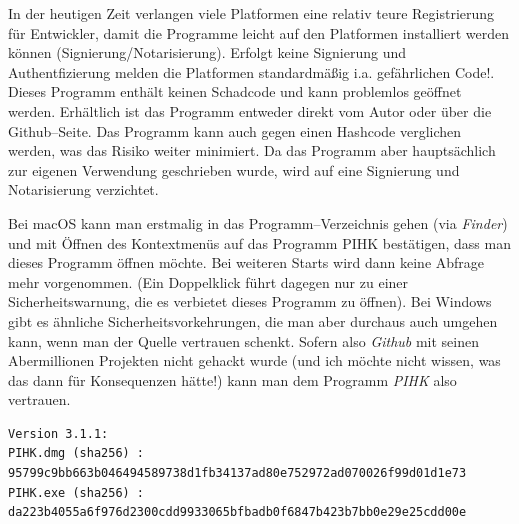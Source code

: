 \documentclass[a4paper,notitlepage,parskip=half]{scrartcl}
\begin{document}
\begin{marker}
In der heutigen Zeit verlangen viele Platformen eine relativ teure Registrierung für Entwickler, damit die Programme leicht auf den Platformen installiert werden können (Signierung/Notarisierung). Erfolgt keine Signierung und Authentfizierung melden die Platformen standardmäßig i.a. gefährlichen Code!. Dieses Programm enthält keinen Schadcode und kann problemlos geöffnet werden.
Erhältlich ist das Programm entweder direkt vom Autor oder über die Github--Seite.
Das Programm kann auch gegen einen Hashcode verglichen werden, was das Risiko weiter minimiert.
Da das Programm aber hauptsächlich zur eigenen Verwendung geschrieben wurde, wird auf eine Signierung und Notarisierung verzichtet.

Bei macOS kann man erstmalig in das Programm--Verzeichnis gehen (via \emph{Finder}) und mit Öffnen des Kontextmenüs auf das Programm PIHK bestätigen, dass man dieses Programm öffnen möchte.
Bei weiteren Starts wird dann keine Abfrage mehr vorgenommen. (Ein Doppelklick führt dagegen nur zu einer Sicherheitswarnung, die es verbietet dieses Programm zu öffnen).
Bei Windows gibt es ähnliche Sicherheitsvorkehrungen, die man aber durchaus auch umgehen kann, wenn man der Quelle vertrauen schenkt.
Sofern also \emph{Github} mit seinen Abermillionen Projekten nicht gehackt wurde (und ich möchte nicht wissen, was das dann für Konsequenzen hätte!) kann man dem Programm \emph{PIHK} also vertrauen.
\end{marker}


\begin{verbatim}
Version 3.1.1:
PIHK.dmg (sha256) : 95799c9bb663b046494589738d1fb34137ad80e752972ad070026f99d01d1e73
PIHK.exe (sha256) : da223b4055a6f976d2300cdd9933065bfbadb0f6847b423b7bb0e29e25cdd00e
\end{verbatim}
\end{document}
